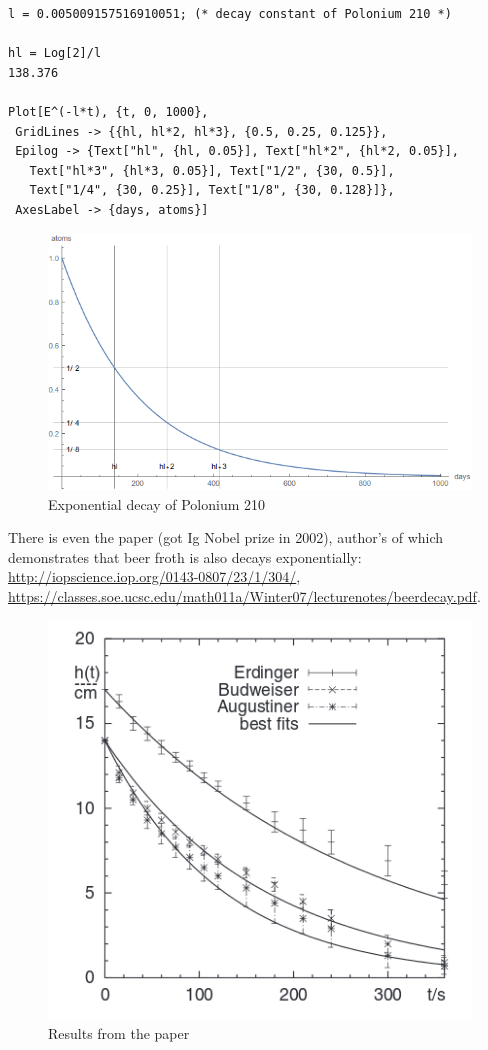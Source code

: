 \begin{lstlisting}[caption=Wolfram Mathematica]
l = 0.005009157516910051; (* decay constant of Polonium 210 *)

hl = Log[2]/l
138.376

Plot[E^(-l*t), {t, 0, 1000}, 
 GridLines -> {{hl, hl*2, hl*3}, {0.5, 0.25, 0.125}}, 
 Epilog -> {Text["hl", {hl, 0.05}], Text["hl*2", {hl*2, 0.05}], 
   Text["hl*3", {hl*3, 0.05}], Text["1/2", {30, 0.5}], 
   Text["1/4", {30, 0.25}], Text["1/8", {30, 0.128}]}, 
 AxesLabel -> {days, atoms}]
\end{lstlisting}

\begin{figure}[H]
\centering
\includegraphics[scale=0.66]{log/210po.png}
\caption{Exponential decay of Polonium 210}
\end{figure}


There is even the paper (got Ig Nobel prize in 2002), author's of which demonstrates that beer froth is also decays exponentially:
\url{http://iopscience.iop.org/0143-0807/23/1/304/},
\url{https://classes.soe.ucsc.edu/math011a/Winter07/lecturenotes/beerdecay.pdf}.

\begin{figure}[H]
\centering
\includegraphics[scale=0.66]{log/beer.png}
\caption{Results from the paper}
\end{figure}

